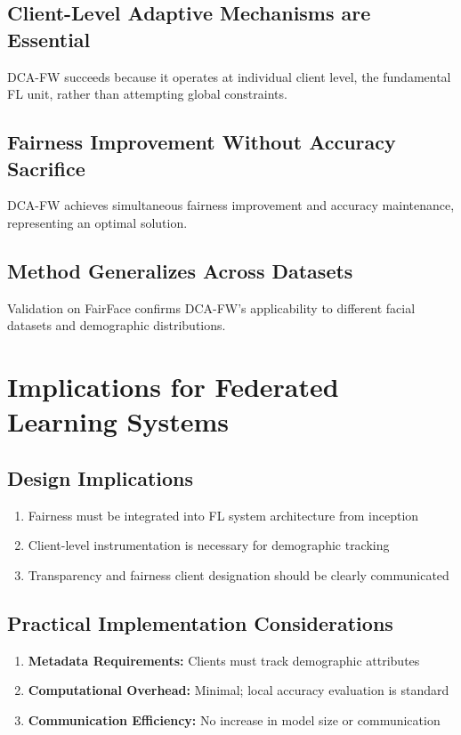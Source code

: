 \documentclass[11pt,a4paper]{report}
\begin{document}
\subsection{Client-Level Adaptive Mechanisms are Essential}

DCA-FW succeeds because it operates at individual client level, the fundamental FL unit, rather than attempting global constraints.

\subsection{Fairness Improvement Without Accuracy Sacrifice}

DCA-FW achieves simultaneous fairness improvement and accuracy maintenance, representing an optimal solution.

\subsection{Method Generalizes Across Datasets}

Validation on FairFace confirms DCA-FW's applicability to different facial datasets and demographic distributions.

\section{Implications for Federated Learning Systems}

\subsection{Design Implications}

\begin{enumerate}
    \item Fairness must be integrated into FL system architecture from inception
    \item Client-level instrumentation is necessary for demographic tracking
    \item Transparency and fairness client designation should be clearly communicated
\end{enumerate}

\subsection{Practical Implementation Considerations}

\begin{enumerate}
    \item \textbf{Metadata Requirements:} Clients must track demographic attributes
    \item \textbf{Computational Overhead:} Minimal; local accuracy evaluation is standard
    \item \textbf{Communication Efficiency:} No increase in model size or communication
\end{enumerate}
\end{document}
